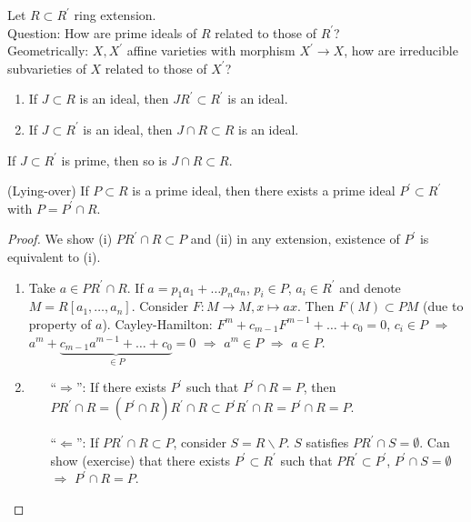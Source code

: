 \documentclass[a4paper,11pt]{article}
\begin{document}
			\noindent Let $R\subset R^\prime$ ring extension.
			\\

			\noindent Question: How are prime ideals of $R$ related to those of $R^\prime$?\\
			Geometrically: $X,X^\prime$ affine varieties with morphism $X^\prime\rightarrow X$, how are irreducible subvarieties of $X$ related to those of $X^\prime$?

			\begin{prop}
				\begin{enumerate}
					\item If $J\subset R$ is an ideal, then $JR^\prime\subset R^\prime$ is an ideal.
					\item If $J\subset R^\prime$ is an ideal, then $J\cap R\subset R$ is an ideal.
				\end{enumerate}
			\end{prop}

			\begin{remark}
				If $J\subset R^\prime$ is prime, then so is $J\cap R\subset R$.
			\end{remark}

			\begin{prop}(Lying-over)
				If $P\subset R$ is a prime ideal, then there exists a prime ideal $P^\prime\subset R^\prime$ with $P=P^\prime\cap R$.
			\end{prop}
			\begin{proof}
				We show (i) $PR^\prime\cap R\subset P$ and (ii) in any extension, existence of $P^\prime$ is equivalent to (i).
				\begin{enumerate}
					\item Take $a\in PR^\prime\cap R$. If $a=p_1a_1+\dots p_na_n$, $p_i\in P$, $a_i\in R^\prime$ and denote $M=R[a_1,\dots,a_n]$. Consider $F:M\rightarrow M,x\mapsto ax$. Then $F(M)\subset PM$ (due to property of $a$). Cayley-Hamilton: $F^m+c_{m-1}F^{m-1}+\dots+c_0=0$, $c_i\in P$ $\Longrightarrow$ $a^m+\underbrace{c_{m-1}a^{m-1}+\dots+c_0}_{\in P}=0$ $\Longrightarrow$ $a^m\in P$ $\Longrightarrow$ $a\in P$.
					\item 
						\begin{enumerate}
							\item[``$\Rightarrow$'':] If there exists $P^\prime$ such that $P^\prime\cap R=P$, then $PR^\prime\cap R=(P^\prime\cap R)R^\prime\cap R\subset P^\prime R^\prime\cap R=P^\prime\cap R=P$.
							\item[``$\Leftarrow$'':] If $PR^\prime\cap R\subset P$, consider $S=R\backslash P$. $S$ satisfies $PR^\prime\cap S=\emptyset$. Can show (exercise) that there exists $P^\prime\subset R^\prime$ such that $PR^\prime\subset P^\prime$, $P^\prime\cap S=\emptyset$ $\Longrightarrow$ $P^\prime\cap R=P$.  
						\end{enumerate}
				\end{enumerate}
			\end{proof}
\end{document}
